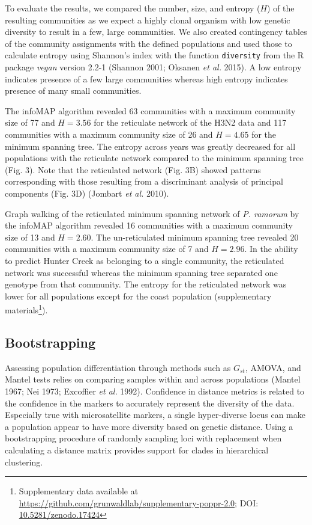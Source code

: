 \documentclass[double,12pt]{beavtex}
\begin{document}
  To evaluate the results, we compared the number, size, and entropy
  (\(H\)) of the resulting communities as we expect a highly clonal
  organism with low genetic diversity to result in a few, large
  communities. We also created contingency tables of the community
  assignments with the defined populations and used those to calculate
  entropy using Shannon's index with the function \texttt{diversity} from
  the R package \emph{vegan} version 2.2-1 (Shannon 2001; Oksanen \emph{et
  al.} 2015). A low entropy indicates presence of a few large communities
  whereas high entropy indicates presence of many small communities.
  
  The infoMAP algorithm revealed 63 communities with a maximum community
  size of 77 and \(H = 3.56\) for the reticulate network of the H3N2 data
  and 117 communities with a maximum community size of 26 and \(H = 4.65\)
  for the minimum spanning tree. The entropy across years was greatly
  decreased for all populations with the reticulate network compared to
  the minimum spanning tree (Fig. 3). Note that the reticulated network
  (Fig. 3B) showed patterns corresponding with those resulting from a
  discriminant analysis of principal components (Fig. 3D) (Jombart
  \emph{et al.} 2010).
  
  Graph walking of the reticulated minimum spanning network of \emph{P.
  ramorum} by the infoMAP algorithm revealed 16 communities with a maximum
  community size of 13 and \(H = 2.60\). The un-reticulated minimum
  spanning tree revealed 20 communities with a maximum community size of 7
  and \(H = 2.96\). In the ability to predict Hunter Creek as belonging to
  a single community, the reticulated network was successful whereas the
  minimum spanning tree separated one genotype from that community. The
  entropy for the reticulated network was lower for all populations except
  for the coast population (supplementary materials\footnote{Supplementary
    data available at
    \url{https://github.com/grunwaldlab/supplementary-poppr-2.0}; DOI:
    \href{http://dx.doi.org/10.5281/zenodo.17424}{10.5281/zenodo.17424}}).
  
  \subsection{Bootstrapping}\label{bootstrapping}
  
  Assessing population differentiation through methods such as \(G_{st}\),
  AMOVA, and Mantel tests relies on comparing samples within and across
  populations (Mantel 1967; Nei 1973; Excoffier \emph{et al.} 1992).
  Confidence in distance metrics is related to the confidence in the
  markers to accurately represent the diversity of the data. Especially
  true with microsatellite markers, a single hyper-diverse locus can make
  a population appear to have more diversity based on genetic distance.
  Using a bootstrapping procedure of randomly sampling loci with
  replacement when calculating a distance matrix provides support for
  clades in hierarchical clustering.
  
\end{document}
